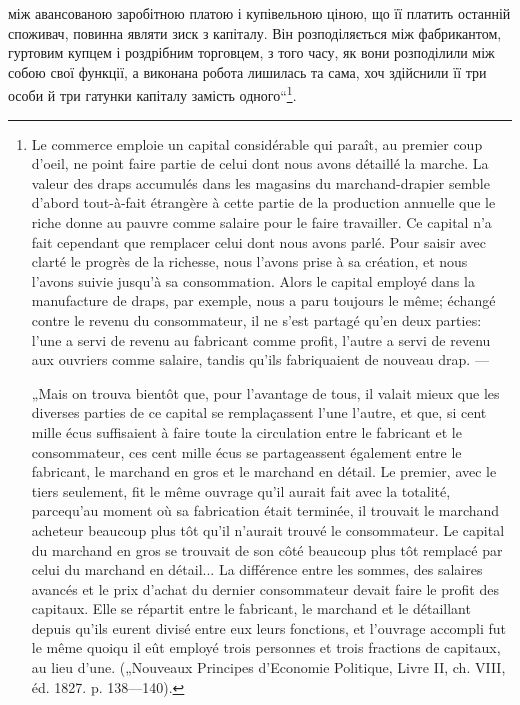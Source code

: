 \parcont{}  %
між авансованою заробітною платою і купівельною ціною, що її платить
останній споживач, повинна являти зиск з капіталу. Він розподіляється
між фабрикантом, гуртовим купцем і роздрібним торговцем, з того часу,
як вони розподілили між собою свої функції, а виконана робота лишилась
та сама, хоч здійснили її три особи й три гатунки капіталу
замість одного“\footnote*{
Le commerce emploie un capital considérable qui paraît, au premier coup
d’oeil, ne point faire partie de celui dont nous avons détaillé la marche. La valeur
des draps accumulés dans les magasins du marchand-drapier semble d'abord tout-à-fait étrangère à
cette partie de la production annuelle que le riche donne au
pauvre comme salaire pour le faire travailler. Ce capital n’a fait cependant que
remplacer celui dont nous avons parlé. Pour saisir avec clarté le progrès de la
richesse, nous l’avons prise à sa création, et nous l’avons suivie jusqu’à sa consommation.
Alors le capital employé dans la manufacture de draps, par exemple, nous a paru
toujours le même; échangé contre le revenu du consommateur, il ne s’est partagé
qu’en deux parties: l’une a servi de revenu au fabricant comme profit, l’autre a servi de revenu aux
ouvriers comme salaire, tandis qu’ils fabriquaient de nouveau drap. —

„Mais on trouva bientôt que, pour l’avantage de tous, il valait mieux que les
diverses parties de ce capital se remplaçassent l’une l’autre, et que, si cent mille
écus suffisaient à faire toute la circulation entre le fabricant et le consommateur,
ces cent mille écus se partageassent également entre le fabricant, le marchand en
gros et le marchand en détail. Le premier, avec le tiers seulement, fit le même
ouvrage qu’il aurait fait avec la totalité, parcequ’au moment où sa fabrication était
terminée, il trouvait le marchand acheteur beaucoup plus tôt qu’il n’aurait trouvé le consommateur.
Le capital du marchand en gros se trouvait de son côté beaucoup
plus tôt remplacé par celui du marchand en détail... La différence entre les sommes, des salaires
avancés et le prix d’achat du dernier consommateur devait faire le profit des capitaux. Elle se
répartit entre le fabricant, le marchand et le détaillant depuis qu’ils eurent divisé entre eux
leurs fonctions, et l’ouvrage accompli fut le même quoiqu il eût employé trois personnes et trois
fractions de capitaux, au lieu d’une.
(„Nouveaux Principes d’Economie Politique, Livre II, ch. VIII, éd. 1827. p. 138—140).
}.

